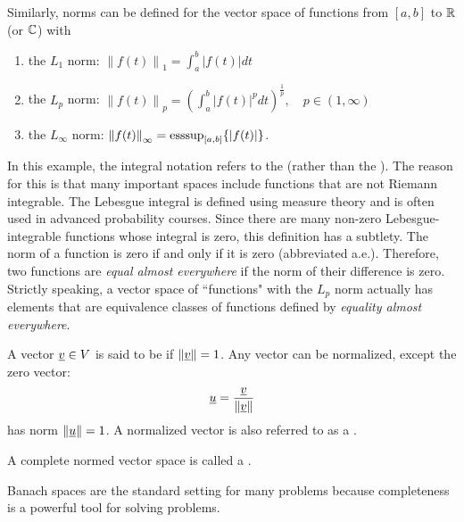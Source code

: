 \begin{example}
Similarly, norms can be defined for the vector space of functions from $[a, b]$ to $\mathbb{R}$ (or $\mathbb{C}$) with
\begin{enumerate}
\item the $L_1$ norm: $\left\| f(t) \right\|_1 = \int_a^b |f(t)| dt$
\item the $L_p$ norm: $\left\| f(t) \right\|_p = \left( \int_a^b |f(t)|^p dt \right)^{\frac{1}{p}}, \quad p \in (1,\infty)$
\item the $L_{\infty}$ norm: $\left\| f(t) \right\|_{\infty} = \operatorname{esssup}_{[a,b]} \{ | f(t) | \}$.
\end{enumerate}
\end{example}

In this example, the integral notation refers to the  (rather than the ).
The reason for this is that many important spaces include functions that are not Riemann integrable.
The Lebesgue integral is defined using measure theory and is often used in advanced probability courses.
Since there are many non-zero Lebesgue-integrable functions whose integral is zero, this definition has a subtlety.
The norm of a function is zero if and only if it is zero  (abbreviated a.e.).
Therefore, two functions are \emph{equal almost everywhere} if the norm of their difference is zero. 
Strictly speaking, a vector space of ``functions" with the $L_p$ norm actually has elements that are equivalence classes of functions defined by \emph{equality almost everywhere}.

\begin{definition}
A vector $\underline{v} \in V$ is said to be  if $\left\| \underline{v} \right\| = 1$.
Any vector can be normalized, except the zero vector:
\begin{equation}
\underline{u} = \frac{\underline{v}}{\left\| \underline{v} \right\|}
\end{equation}
has norm $\left\| \underline{u} \right\| = 1$.
A normalized vector is also referred to as a .
\end{definition}

\begin{definition}
A complete normed vector space is called a .
\end{definition}

Banach spaces are the standard setting for many problems because completeness is a powerful tool for solving problems.

